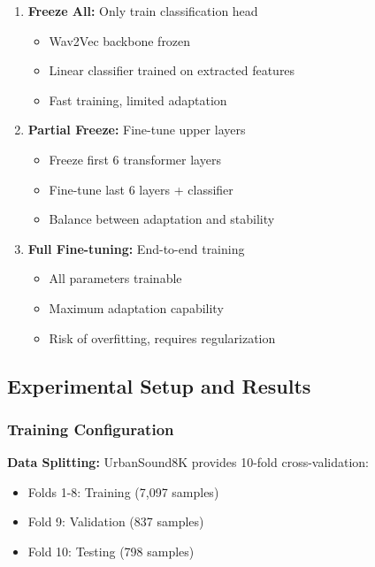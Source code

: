 \documentclass[conference]{IEEEtran}
\begin{document}
\begin{enumerate}[label=\arabic*.]
  \item \textbf{Freeze All:} Only train classification head
     \begin{itemize}
       \item Wav2Vec backbone frozen
       \item Linear classifier trained on extracted features
       \item Fast training, limited adaptation
     \end{itemize}

  \item \textbf{Partial Freeze:} Fine-tune upper layers
     \begin{itemize}
       \item Freeze first 6 transformer layers
       \item Fine-tune last 6 layers + classifier
       \item Balance between adaptation and stability
     \end{itemize}

  \item \textbf{Full Fine-tuning:} End-to-end training
     \begin{itemize}
       \item All parameters trainable
       \item Maximum adaptation capability
       \item Risk of overfitting, requires regularization
     \end{itemize}
\end{enumerate}

\subsection{Experimental Setup and Results}
\label{sec:q2_experiments}

\subsubsection{Training Configuration}
\label{sec:q2_training_setup}

\textbf{Data Splitting:} UrbanSound8K provides 10-fold cross-validation:
\begin{itemize}
  \item Folds 1-8: Training (7,097 samples)
  \item Fold 9: Validation (837 samples)
  \item Fold 10: Testing (798 samples)
\end{itemize}
\end{document}
